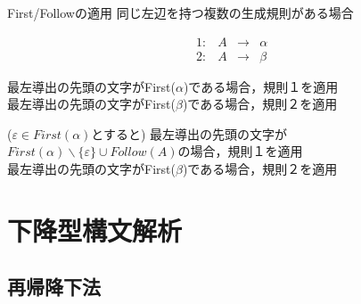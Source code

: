\documentclass[dvipdfmx]{beamer}
\begin{document}
\begin{frame}{First/Followの適用}
  同じ左辺を持つ複数の生成規則がある場合

  \[\begin{array}{crcl}
      1: & A & \rightarrow & \alpha \\
      2: & A & \rightarrow & \beta
    \end{array}\]


  最左導出の先頭の文字がFirst($\alpha$)である場合，規則１を適用\\
  最左導出の先頭の文字がFirst($\beta$)である場合，規則２を適用\\

  \vspace*{10pt}


  ($\varepsilon\in First(\alpha)$とすると)
  最左導出の先頭の文字が$First(\alpha)\backslash\{\varepsilon\}\cup Follow(A)$の場合，規則１を適用\\
  最左導出の先頭の文字がFirst($\beta$)である場合，規則２を適用

  \vspace*{10pt}


\end{frame}

\section{下降型構文解析}

\subsection{再帰降下法}
\end{document}

